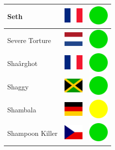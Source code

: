 \documentclass[12pt, a4paper, twoside]{report}
\begin{document}
\begin{center}
\begin{longtable}{|p{5cm}|p{2cm}|p{2cm}|}
Seth & \includegraphics[width=1cm]{4x3/fr} & \includegraphics[width=1cm]{likes/y} \\ \hline
Severe Torture & \includegraphics[width=1cm]{4x3/nl} & \includegraphics[width=1cm]{likes/y} \\ \hline
Shaârghot & \includegraphics[width=1cm]{4x3/fr} & \includegraphics[width=1cm]{likes/y} \\ \hline
Shaggy & \includegraphics[width=1cm]{4x3/jm} & \includegraphics[width=1cm]{likes/y} \\ \hline
Shambala & \includegraphics[width=1cm]{4x3/de} & \includegraphics[width=1cm]{likes/m} \\ \hline
Shampoon Killer & \includegraphics[width=1cm]{4x3/cz} & \includegraphics[width=1cm]{likes/y} \\ \hline

\end{longtable}
\end{center}
\end{document}
